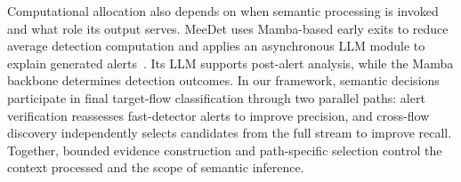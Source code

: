 Computational allocation also depends on when semantic processing is invoked and what role its output serves.
MeeDet uses Mamba-based early exits to reduce average detection computation and applies an asynchronous LLM module to explain generated alerts~\cite{E03}.
Its LLM supports post-alert analysis, while the Mamba backbone determines detection outcomes.
In our framework, semantic decisions participate in final target-flow classification through two parallel paths: alert verification reassesses fast-detector alerts to improve precision, and cross-flow discovery independently selects candidates from the full stream to improve recall.
Together, bounded evidence construction and path-specific selection control the context processed and the scope of semantic inference.
